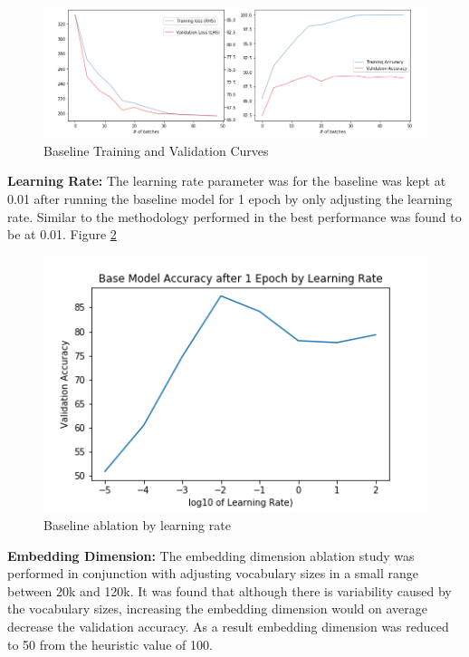 \documentclass[a4paper,10pt]{article}
\begin{document}
\begin{figure}[h]
    \centering
    \includegraphics[scale=0.4]{trainvalcurves}
    \caption{Baseline Training and Validation Curves}
    \label{fig:trainvalcurves}
\end{figure}

\par
\justify
\textbf{Learning Rate:} The learning rate parameter was for the baseline was kept at 0.01 after running the baseline model for 1 epoch by only adjusting the learning rate. Similar to the methodology performed in \cite{learningrate} the best performance was found to be at 0.01. Figure \ref{fig:lrexplore}


\begin{figure}[h]
    \centering
    \includegraphics[scale=0.3]{lr_explore}
    \caption{Baseline ablation by learning rate}
    \label{fig:lrexplore}
\end{figure}


\par
\justify
\textbf{Embedding Dimension:} The embedding dimension ablation study was performed in conjunction with adjusting vocabulary sizes in a small range between 20k and 120k. It was found that although there is variability caused by the vocabulary sizes, increasing the embedding dimension would on average decrease the validation accuracy. As a result embedding dimension was reduced to 50 from the heuristic value of 100.
\end{document}
